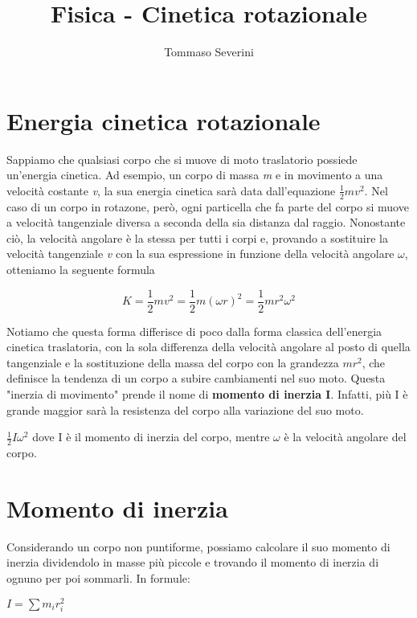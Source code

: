 \documentclass[10pt,a4paper]{article}
\author{Tommaso Severini}
\title{Fisica - Cinetica rotazionale}
\begin{document}
	\maketitle
	
	
	\section{Energia cinetica rotazionale}
	
	Sappiamo che qualsiasi corpo che si muove di moto traslatorio possiede un'energia cinetica. Ad esempio, un corpo di massa \textit{m} e in movimento a una velocità costante \textit{v}, la sua energia cinetica sarà data dall'equazione $\frac{1}{2}mv^2$.
	Nel caso di un corpo in rotazone, però, ogni particella che fa parte del corpo si muove a velocità tangenziale diversa a seconda della sia distanza dal raggio. Nonostante ciò, la velocità angolare è la stessa per tutti i corpi e, provando a sostituire la velocità tangenziale \textit{v} con la sua espressione in funzione della velocità angolare $\omega$, otteniamo la seguente formula
	
	\begin{equation}
		K = \frac{1}{2}mv^2 = \frac{1}{2}m (\omega r)^2 = \frac{1}{2}mr^2\omega^2
	\end{equation} 

	Notiamo che questa forma differisce di poco dalla forma classica dell'energia cinetica traslatoria, con la sola differenza della velocità angolare al posto di quella tangenziale e la sostituzione della massa del corpo con la grandezza $mr^2$, che definisce la tendenza di un corpo a subire cambiamenti nel suo moto. Questa "inerzia di movimento" prende il nome di \textbf{momento di inerzia I}. Infatti, più I è grande maggior sarà la resistenza del corpo alla variazione del suo moto.  
	
	\begin{definition}
		$\frac{1}{2}I \omega^2$ dove I è il momento di inerzia del corpo, mentre $\omega$ è la velocità angolare del corpo.
	\end{definition}

	\section{Momento di inerzia}
	
	Considerando un corpo non puntiforme, possiamo calcolare il suo momento di inerzia dividendolo in masse più piccole e trovando il momento di inerzia di ognuno per poi sommarli. In formule:
	
	\begin{definition}
		$I = \sum m_i r_i^2$
	\end{definition}
	
\end{document}
